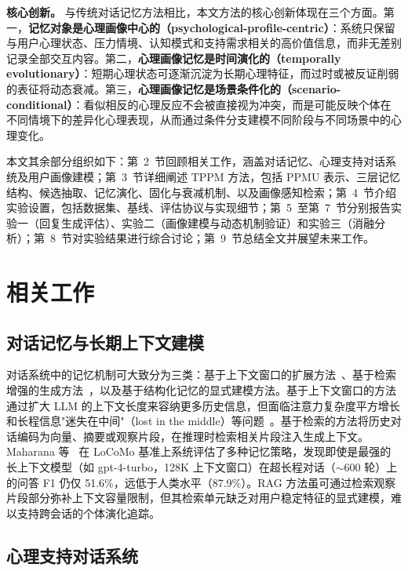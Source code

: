 \documentclass[12pt,a4paper]{article}
\begin{document}
\textbf{核心创新。} 与传统对话记忆方法相比，本文方法的核心创新体现在三个方面。第一，\textbf{记忆对象是心理画像中心的（psychological-profile-centric）}：系统只保留与用户心理状态、压力情境、认知模式和支持需求相关的高价值信息，而非无差别记录全部交互内容。第二，\textbf{心理画像记忆是时间演化的（temporally evolutionary）}：短期心理状态可逐渐沉淀为长期心理特征，而过时或被反证削弱的表征将动态衰减。第三，\textbf{心理画像记忆是场景条件化的（scenario-conditional）}：看似相反的心理反应不会被直接视为冲突，而是可能反映个体在不同情境下的差异化心理表现，从而通过条件分支建模不同阶段与不同场景中的心理变化。

本文其余部分组织如下：第~2~节回顾相关工作，涵盖对话记忆、心理支持对话系统及用户画像建模；第~3~节详细阐述 TPPM 方法，包括 PPMU 表示、三层记忆结构、候选抽取、记忆演化、固化与衰减机制、以及画像感知检索；第~4~节介绍实验设置，包括数据集、基线、评估协议与实现细节；第~5~至第~7~节分别报告实验一（回复生成评估）、实验二（画像建模与动态机制验证）和实验三（消融分析）；第~8~节对实验结果进行综合讨论；第~9~节总结全文并展望未来工作。

\section{相关工作}
\label{sec:related}

\subsection{对话记忆与长期上下文建模}

对话系统中的记忆机制可大致分为三类：基于上下文窗口的扩展方法~\cite{liu2024lost}、基于检索增强的生成方法~\cite{lewis2020retrieval}，以及基于结构化记忆的显式建模方法。基于上下文窗口的方法通过扩大 LLM 的上下文长度来容纳更多历史信息，但面临注意力复杂度平方增长和长程信息"迷失在中间"（lost in the middle）等问题~\cite{liu2024lost}。基于检索的方法将历史对话编码为向量、摘要或观察片段，在推理时检索相关片段注入生成上下文。Maharana 等~\cite{maharana2024locomo} 在 LoCoMo 基准上系统评估了多种记忆策略，发现即使是最强的长上下文模型（如 gpt-4-turbo，128K 上下文窗口）在超长程对话（$\sim$600 轮）上的问答 F1 仍仅 51.6\%，远低于人类水平（87.9\%）。RAG 方法虽可通过检索观察片段部分弥补上下文容量限制，但其检索单元缺乏对用户稳定特征的显式建模，难以支持跨会话的个体演化追踪。

\subsection{心理支持对话系统}
\end{document}
